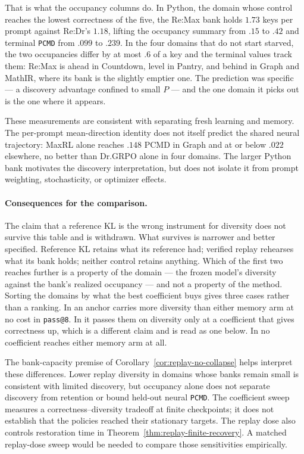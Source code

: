 \documentclass{article}
\newcommand{\1}{\mathbf 1}
\newcommand{\pmd}{\texttt{PCMD}}
\theoremstyle{remark}
\theoremstyle{definition}
\theoremstyle{plain}
\begin{document}
That is what the occupancy columns do. In Python, the domain whose control
reaches the lowest correctness of the five, the Re:Max bank holds $1.73$ keys
per prompt against Re:Dr's $1.18$, lifting the occupancy summary from $.15$ to
$.42$ and terminal \pmd{} from $.099$ to $.239$. In the four domains that do
not start starved, the two occupancies differ by at most $.6$ of a key and the
terminal values track them: Re:Max is ahead in Countdown, level in Pantry, and
behind in Graph and MathIR, where its bank is the slightly emptier one. The
prediction was specific --- a discovery advantage confined to small $P$ --- and
the one domain it picks out is the one where it appears.

These measurements are consistent with separating fresh learning and
memory. The per-prompt mean-direction identity does not itself predict the
shared neural trajectory: MaxRL alone reaches $.148$ PCMD in Graph and at
or below $.022$ elsewhere, no better than Dr.GRPO alone in four domains.
The larger Python bank motivates the discovery interpretation, but does not
isolate it from prompt weighting, stochasticity, or optimizer effects.

\paragraph{Consequences for the comparison.}
The claim that a reference KL is the wrong instrument for diversity does not
survive this table and is withdrawn. What survives is narrower and better
specified. Reference KL retains what its reference had; verified replay
rehearses what its bank holds; neither control retains anything. Which of the
first two reaches further is a property of the domain --- the frozen model's
diversity against the bank's realized occupancy --- and not a property of the
method. Sorting the domains by what the best coefficient buys gives three
cases rather than a ranking. In \MDklFreeNames{} an anchor carries more diversity than
either memory arm at no cost in \texttt{pass@8}. In \MDklPricedNames{} it
passes them on diversity only at a coefficient that gives correctness up, which
is a different claim and is read as one below. In \MDklMemoryNames{} no
coefficient reaches either memory arm at all.

The bank-capacity premise of Corollary~\ref{cor:replay-no-collapse}
helps interpret these differences. Lower replay diversity in domains whose
banks remain small is consistent with limited discovery, but occupancy alone
does not separate discovery from retention or bound held-out neural
\pmd{}. The coefficient sweep measures a correctness--diversity tradeoff
at finite checkpoints; it does not establish that the policies reached
their stationary targets. The replay dose also controls restoration time
in Theorem~\ref{thm:replay-finite-recovery}. A matched replay-dose sweep
would be needed to compare those sensitivities empirically.
\end{document}
